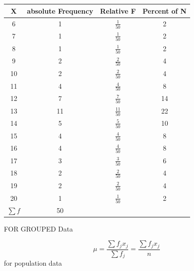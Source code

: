 \documentclass[12pt]{article}
\begin{document}
\begin{table}[H]
    \centering
    \begin{tabular}{|c|c|c|c|}
        \hline X        & absolute Frequency & Relative F      & Percent of N \\
        \hline 6        & 1                  & $\frac{1}{50}$  & 2            \\
        \hline 7        & 1                  & $\frac{1}{50}$  & 2            \\
        \hline 8        & 1                  & $\frac{1}{50}$  & 2            \\
        \hline 9        & 2                  & $\frac{2}{50}$  & 4            \\
        \hline 10       & 2                  & $\frac{2}{50}$  & 4            \\
        \hline 11       & 4                  & $\frac{4}{50}$  & 8            \\
        \hline 12       & 7                  & $\frac{7}{50}$  & 14           \\
        \hline 13       & 11                 & $\frac{11}{50}$ & 22           \\
        \hline 14       & 5                  & $\frac{5}{50}$  & 10           \\
        \hline 15       & 4                  & $\frac{4}{50}$  & 8            \\
        \hline 16       & 4                  & $\frac{4}{50}$  & 8            \\
        \hline 17       & 3                  & $\frac{3}{50}$  & 6            \\
        \hline 18       & 2                  & $\frac{2}{50}$  & 4            \\
        \hline 19       & 2                  & $\frac{2}{50}$  & 4            \\
        \hline 20       & 1                  & $\frac{1}{50}$  & 2            \\
        \hline $\sum f$ & 50                 &                 &              \\

        \hline
    \end{tabular}
\end{table}


FOR GROUPED Data

\begin{equation*}
    \mu = \frac{\sum f_j x_j}{\sum f_j}  = \frac{\sum f_j x_j}{n}
\end{equation*}
for population data
\end{document}
